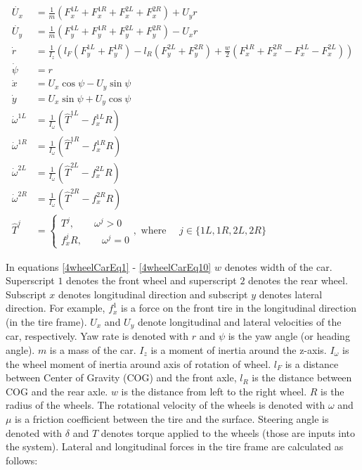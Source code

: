\documentclass[paper=a4, fontsize=11pt]{scrartcl} %
\numberwithin{equation}{section} %
\numberwithin{figure}{section} %
\numberwithin{table}{section} %
\begin{document}
\begin{align}
\dot{{U_x}} &  = \frac{1}{m} \left( F_x^{1L} + F_x^{1R} + F_x^{2L} +F_x^{2R} \right) + U_yr \label{4wheelCarEq1}      \\
\dot{U_y}   & = \frac{1}{m} \left(F_y^{1L} + F_y^{1R} + F_y^{2L} + F_y^{2R}  \right)  - U_xr \\
\dot{r}  & = \frac{1}{I_z}  \left( l_F \left(F_y^{1L} + F_y^{1R} \right) -l_R \left(F_y^{2L} + F_y^{2R} \right) + \frac{w}{2}\left(F_x^{1R} + F_x^{2R} - F_x^{1L} - F_x^{2L} \right)    \right) \\
\dot{\psi}  & = r \\
\dot{x}  & = U_x\cos\psi - U_y\sin\psi \\
\dot{y}  & = U_x\sin\psi + U_y\cos\psi \\
\dot{\omega}^{1L}  & = \frac{1}{I_{\omega}}\left( \hat{T}^{1L} - f_x^{1L}R\right)  \\
\dot{\omega}^{1R}  & = \frac{1}{I_{\omega}}\left( \hat{T}^{1R} - f_x^{1R}R\right) \\ 
\dot{\omega}^{2L}  & = \frac{1}{I_{\omega}}\left( \hat{T}^{2L} - f_x^{2L}R\right)  \\
\dot{\omega}^{2R}  & = \frac{1}{I_{\omega}}\left( \hat{T}^{2R} - f_x^{2R}R\right) \label{4wheelCarEq10} \\ 
\hat{T}^j& = \begin{cases}   T^j, \qquad \omega^j > 0 \\
f_x^jR, \qquad \omega^j = 0 
\end{cases}, \text{ where } \quad j \in \{1L, 1R, 2L, 2R \} \label{discontinuous}
\end{align}

In equations \ref{4wheelCarEq1} - \ref{4wheelCarEq10} $w$ denotes width of the car. Superscript $1$ denotes the front wheel and superscript $2$ denotes the rear wheel. Subscript $x$ denotes longitudinal direction and subscript $y$ denotes lateral direction. For example, $f^1_x$ is a force on the front tire in the longitudinal direction (in the tire frame). $U_x$ and $U_y$ denote longitudinal and lateral velocities of the car, respectively. Yaw rate is denoted with $r$ and $\psi$ is the yaw angle (or heading angle). 
$m$ is a mass of the car.
$I_z$ is a moment of inertia around the z-axis.
$I_\omega$ is the wheel moment of inertia around axis of rotation of wheel.
$l_F$ is a distance between Center of Gravity (COG) and the front axle, $l_R$ is the distance between COG and the rear axle. $w$ is the distance from left to the right wheel. $R$ is the radius of the wheels. The rotational velocity of the wheels is denoted with $\omega$ and $\mu$ is a friction coefficient between the tire and the surface. Steering angle is denoted with $\delta$ and $T$ denotes torque applied to the wheels (those are inputs into the system). Lateral and longitudinal forces in the tire frame are calculated as follows:
\end{document}
